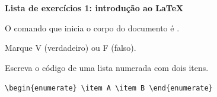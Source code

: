 \documentclass[12pt, a4paper]{exam}
\begin{document}
\begin{center}\large\bfseries Lista de exercícios 1: introdução ao \LaTeX\end{center}

\begin{questions}
  \question O comando que inicia o corpo do documento é
    .

  \question Marque V (verdadeiro) ou F (falso).

  \question Escreva o código de uma lista numerada com dois itens.
  \begin{solutionorbox}[2.5cm]
    \texttt{\textbackslash begin\{enumerate\} \textbackslash item A
      \textbackslash item B
      \textbackslash end\{enumerate\}}
  \end{solutionorbox}
\end{questions}
\end{document}
